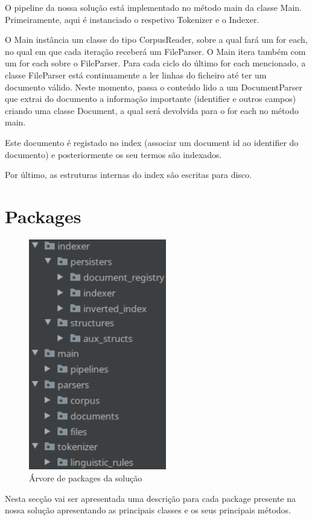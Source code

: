 \documentclass[12pt]{article}
\begin{document}
O pipeline da nossa solução está implementado no método main da classe
Main. Primeiramente, aqui é instanciado o respetivo Tokenizer e o Indexer.

O Main instância um classe do tipo CorpusReader, sobre a qual fará um for each, no
qual em que cada iteração receberá um FileParser. O Main itera também com um
for each sobre o FileParser. Para cada ciclo do último for each mencionado, a classe
FileParser está continuamente a ler linhas do ficheiro até ter um documento
válido. Neste momento, passa o conteúdo lido a um DocumentParser que extrai
do documento a informação importante (identifier e outros campos) criando
uma classe Document, a qual será devolvida para o for each no método main.

Este documento é registado no index (associar um document id ao identifier do
documento) e posteriormente os seu termos são indexados.

Por último, as estruturas internas do index são escritas para disco.

\section{Packages}

\begin{figure}[H]
  \center
  \includegraphics[width=6cm]{packages_all.png}
  \caption{Árvore de packages da solução}
\end{figure}

Nesta secção vai ser apresentada uma descrição para cada package presente na
nossa solução apresentando as principais classes e os seus principais métodos. 
\end{document}
